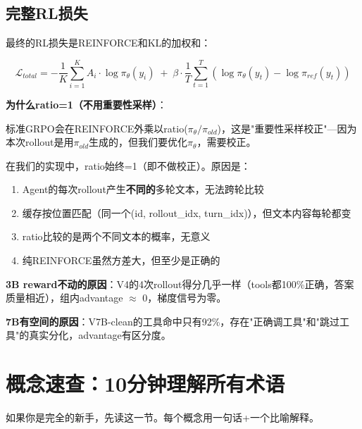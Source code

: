 \documentclass[fontset=none,11pt,a4paper]{ctexart}
\begin{document}
\subsection{完整RL损失}

最终的RL损失是REINFORCE和KL的加权和：

\[
\mathcal{L}_{total} = -\frac{1}{K}\sum_{i=1}^{K} A_i \cdot \log\pi_\theta(y_i) \;+\; \beta \cdot \frac{1}{T}\sum_{t=1}^{T} (\log\pi_\theta(y_t) - \log\pi_{ref}(y_t))
\]

\textbf{为什么ratio=1（不用重要性采样）}：

标准GRPO会在REINFORCE外乘以ratio($\pi_\theta/\pi_{old}$)，这是"重要性采样校正"---因为本次rollout是用$\pi_{old}$生成的，但我们要优化$\pi_\theta$，需要校正。

在我们的实现中，ratio始终=1（即不做校正）。原因是：
\begin{enumerate}[nosep]
    \item Agent的每次rollout产生\textbf{不同的}多轮文本，无法跨轮比较
    \item 缓存按位置匹配（同一个(id, rollout\_idx, turn\_idx)），但文本内容每轮都变
    \item ratio比较的是两个不同文本的概率，无意义
    \item 纯REINFORCE虽然方差大，但至少是正确的
\end{enumerate}

\textbf{3B reward不动的原因}：V4的4次rollout得分几乎一样（tools都100\%正确，答案质量相近），组内advantage $\approx$ 0，梯度信号为零。

\textbf{7B有空间的原因}：V7B-clean的工具命中只有92\%，存在"正确调工具"和"跳过工具"的真实分化，advantage有区分度。

\section{概念速查：10分钟理解所有术语}

如果你是完全的新手，先读这一节。每个概念用一句话+一个比喻解释。
\end{document}
